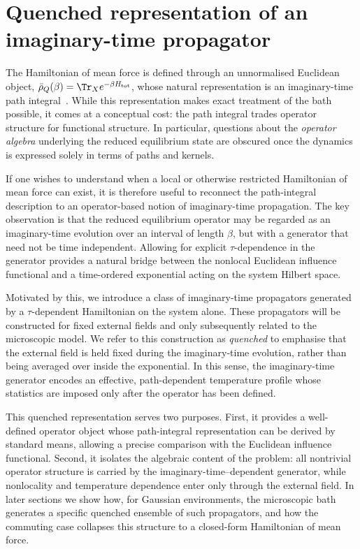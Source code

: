 \section{Quenched representation of an imaginary-time propagator\label{sec:quenched}}

The Hamiltonian of mean force is defined through an unnormalised Euclidean object,
$\bar\rho_Q(\beta)=\Tr_X e^{-\beta H_{\mathrm{tot}}}$, whose natural representation
is an imaginary-time path integral~\cite{feynmanQuantumMechanicsPath1965, kleinertPathIntegralsQuantum2009}. While this representation makes exact treatment of the bath possible, it comes at a conceptual cost: the path
integral trades operator structure for functional structure. In particular,
questions about the \emph{operator algebra} underlying the reduced equilibrium
state are obscured once the dynamics is expressed solely in terms of paths and
kernels.

If one wishes to understand when a local or otherwise restricted Hamiltonian of
mean force can exist, it is therefore useful to reconnect the path-integral
description to an operator-based notion of imaginary-time propagation. The key
observation is that the reduced equilibrium operator may be regarded as an
imaginary-time evolution over an interval of length $\beta$, but with a generator
that need not be time independent. Allowing for explicit $\tau$-dependence in
the generator provides a natural bridge between the nonlocal Euclidean influence
functional and a time-ordered exponential acting on the system Hilbert space.

Motivated by this, we introduce a class of imaginary-time propagators generated
by a $\tau$-dependent Hamiltonian on the system alone. These propagators will be
constructed for fixed external fields and only subsequently related to the
microscopic model. We refer to this construction as \emph{quenched} to emphasise
that the external field is held fixed during the imaginary-time evolution,
rather than being averaged over inside the exponential. In this sense, the
imaginary-time generator encodes an effective, path-dependent temperature
profile whose statistics are imposed only after the operator has been defined.

This quenched representation serves two purposes. First, it provides a
well-defined operator object whose path-integral representation can be derived
by standard means, allowing a precise comparison with the Euclidean influence
functional. Second, it isolates the algebraic content of the problem: all
nontrivial operator structure is carried by the imaginary-time–dependent
generator, while nonlocality and temperature dependence enter only through the
external field. In later sections we show how, for Gaussian environments, the
microscopic bath generates a specific quenched ensemble of such propagators,
and how the commuting case collapses this structure to a closed-form Hamiltonian
of mean force.

